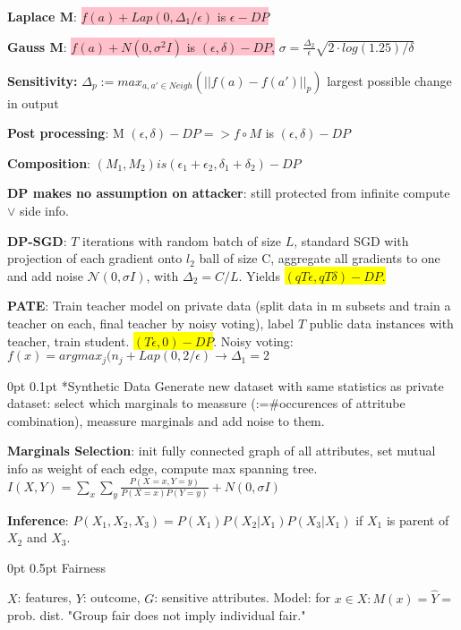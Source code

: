 \documentclass[11pt,landscape,a4paper,fleqn]{article}
\makeatletter
\renewcommand{\section}{\@startsection{section}{1}{0mm}%
                                {0pt}%
                                {0.5pt}%
                                {\color{myorange}\sffamily\small\bfseries}}
\renewcommand{\subsection}{\@startsection{subsection}{1}{0mm}%
                                {0pt}%
                                {0.1pt}%
                            	{\color{myorange2}\sffamily\small}}
\newcommand{\mhl}[1]{\setlength{\fboxsep}{0pt}\colorbox{yellow}{#1}}
\makeatother
\begin{document}
\begin{multicols*}{4}
\textbf{Laplace M}: \colorbox{pink}{$f(a)+Lap(0, \Delta_1/\epsilon)$ is $\epsilon-DP$}

\textbf{Gauss M}: \colorbox{pink}{$f(a)+N(0,\sigma^2I)$ is $(\epsilon,\delta)-DP$,} $\sigma=\frac{\Delta_2}{\epsilon}\sqrt{2 \cdot log(1.25)/\delta}$

\textbf{Sensitivity:} $\Delta_p :=max_{a,a'\in Neigh}(||f(a) - f(a')||_p) $ largest possible change in output

\textbf{Post processing}: M $(\epsilon, \delta)-DP => f\circ M$ is $(\epsilon, \delta)-DP$

\textbf{Composition}: $(M_1, M_2) is (\epsilon_1 + \epsilon_2, \delta_1 + \delta_2)-DP$

\textbf{DP makes no assumption on attacker}: still protected from infinite compute $\lor$ side info.

\textbf{DP-SGD}: $T$ iterations with random batch of size $L$, standard SGD with projection of each gradient onto $l_2$ ball of size C, aggregate all gradients to one and add noise $\mathcal{N}(0, \sigma I)$, with $\Delta_2 = C / L$. Yields \mhl{$(qT\epsilon, qT\delta)-DP$.}

\textbf{PATE}: Train teacher model on private data (split data in m subsets and train a teacher on each, final teacher by noisy voting), label $T$ public data instances with teacher, train student. \mhl{$(T\epsilon, 0)-DP$}. Noisy voting: $f(x) = argmax_j( n_j + Lap(0, 2/\epsilon) \rightarrow \Delta_1 = 2$

\subsection*{Synthetic Data}
Generate new dataset with same statistics as private dataset: select which marginals to meassure (:=\#occurences of attritube combination), meassure marginals and add noise to them.

\textbf{Marginals Selection}: init fully connected graph of all attributes, set mutual info as weight of each edge, compute max spanning tree. $I(X,Y) = \sum_x\sum_y\frac{P(X=x, Y=y)}{P(X=x)P(Y=y)} + N(0, \sigma I)$

\textbf{Inference}: $P(X_1, X_2, X_3) = P(X_1)P(X_2 | X_1)P(X_3 | X_1)$ if $X_1$ is parent of $X_2$ and $X_3$.

\section{Fairness}

$X$: features, $Y$: outcome, $G$: sensitive attributes. Model: for $x\in X: M(x)=\hat{Y}=$ prob. dist. "Group fair does not imply individual fair."


\end{multicols*}
\end{document}
